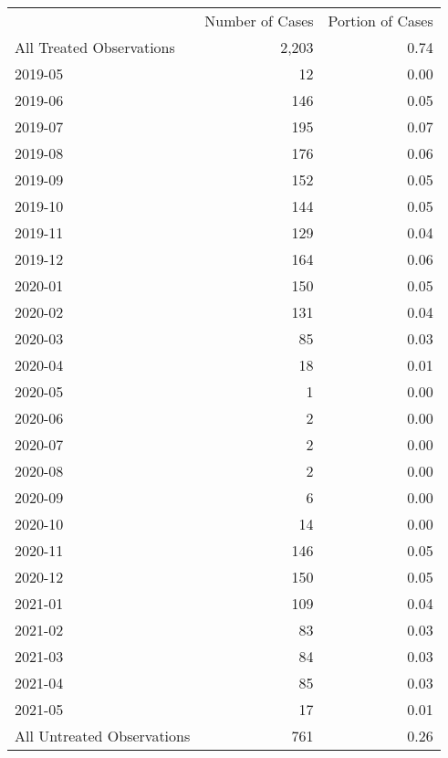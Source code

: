 \begin{tabular}{lrr}
 & Number of Cases & Portion of Cases \\
All Treated Observations & 2,203 & 0.74 \\
2019-05 & 12 & 0.00 \\
2019-06 & 146 & 0.05 \\
2019-07 & 195 & 0.07 \\
2019-08 & 176 & 0.06 \\
2019-09 & 152 & 0.05 \\
2019-10 & 144 & 0.05 \\
2019-11 & 129 & 0.04 \\
2019-12 & 164 & 0.06 \\
2020-01 & 150 & 0.05 \\
2020-02 & 131 & 0.04 \\
2020-03 & 85 & 0.03 \\
2020-04 & 18 & 0.01 \\
2020-05 & 1 & 0.00 \\
2020-06 & 2 & 0.00 \\
2020-07 & 2 & 0.00 \\
2020-08 & 2 & 0.00 \\
2020-09 & 6 & 0.00 \\
2020-10 & 14 & 0.00 \\
2020-11 & 146 & 0.05 \\
2020-12 & 150 & 0.05 \\
2021-01 & 109 & 0.04 \\
2021-02 & 83 & 0.03 \\
2021-03 & 84 & 0.03 \\
2021-04 & 85 & 0.03 \\
2021-05 & 17 & 0.01 \\
All Untreated Observations & 761 & 0.26 \\
\end{tabular}
